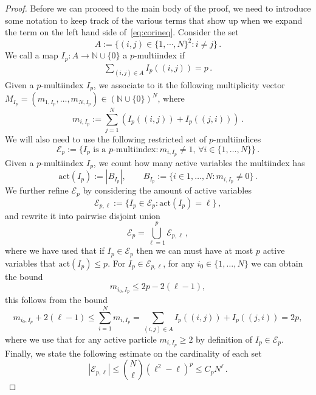 \documentclass[10pt,a4paper]{amsart}
\newcommand{\N}{\mathbb{N}}
\begin{document}
\begin{proof}
  Before we can proceed to the main body of the proof, we need to introduce some notation to keep track of the various terms that show up when we expand the term on the left hand side of~\eqref{eq:corineq}. Consider the set  
\begin{equation}
\label{eq:defI}
A:= \{(i,j)\in \{1,\cdots,N\}^2:i\neq j\}\, .
\end{equation}
We call a map $I_p:A \to \N\cup\{0\}$ a $p$-multiindex if 
\begin{align}
\sum_{(i,j)\in A}I_p((i,j))=p\, .
\end{align}
Given a $p$-multiindex $I_p$, we associate to it the following multiplicity vector $M_{I_p}= (m_{1,I_p},\dots,m_{N,I_p})\in (\N\cup\{0\})^N$, where
\begin{equation}
m_{i,I_p}:= \sum_{j =1}^N \left(I_p((i,j)) + I_p((j,i))\right)\, .
\end{equation}
We will also need to use the following restricted set of $p$-multiindices
\begin{equation}
\label{eq:restrictedset}
\mathcal{E}_{p}:= \{I_p \text{ is a }p \text{-multiindex}:m_{i,I_p}\neq 1,\, \forall i \in \{1,\dots,N\}\}\,.
\end{equation}
Given a $p$-multiindex $I_p$, we count how many active variables the multiindex has
\begin{equation}
\mathrm{act}(I_p):=\left|B_{I_p}\right|, \qquad B_{I_p}:=\{i \in {1, \dots,N}:m_{i,I_p}\neq 0\}\,.
\end{equation}
We further refine $\mathcal{E}_p$ by considering the amount of active variables
\begin{equation}
\mathcal{E}_{p,\ell}:= \{I_p \in \mathcal{E}_{p}: \mathrm{act}(I_p)=\ell\}\,,
\end{equation}
and rewrite it into pairwise disjoint union
\begin{equation}
\mathcal{E}_p= \bigcup_{\ell=1}^p \mathcal{E}_{p,\ell}\, ,
\end{equation}
where we have used that if $I_p \in \mathcal{E}_p$ then we can must have  at most $p$ active variables that $\mathrm{act}(I_p) \leq p$. For $I_p\in\mathcal{E}_{p,\ell}$, for any $i_0\in \{1,\dots,N\}$ we can obtain the bound
\begin{equation}\label{boundonmi}
    m_{i_0,I_{p}}\le 2p-2(\ell-1),
\end{equation}
this follows from the bound
$$
m_{i_0,I_{p}}+2(\ell-1) \le \sum_{i=1}^Nm_{i,I_{p}}=\sum_{(i,j)\in A}I_p((i,j))+I_p((j,i))=2p,
$$
where we use that for any active particle $m_{i,I_{p}}\ge 2$ by definition of $I_p\in\mathcal{E}_p$. Finally, we state the following estimate on the cardinality of each set
\begin{equation}
|\mathcal{E}_{p,\ell}|\le  {N\choose\ell}(\ell^2 -\ell)^p\le C_p N^{\ell}
\label{eq:sizeE}\, .
\end{equation}



\end{proof}
\end{document}
